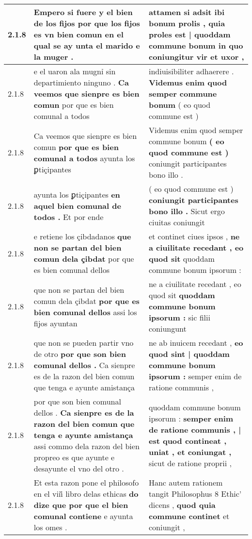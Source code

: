 \begin{tabular}{|p{1cm}|p{6.5cm}|p{6.5cm}|}
2.1.8 & Empero si fuere y el bien de los fijos \textbf{ por que los fijos es vn bien comun } en el qual se ay unta el marido e la muger . & attamen si adsit ibi bonum prolis , \textbf{ quia proles est | quoddam commune bonum } in quo coniungitur vir et uxor , \\\hline
2.1.8 & e el uaron ala mugnỉ sin departimiento ninguno . \textbf{ Ca veemos que sienpre es bien comun } por que es bien comunal a todos & indiuisibiliter adhaerere . \textbf{ Videmus enim quod semper commune bonum } ( eo quod commune est ) \\\hline
2.1.8 & Ca veemos que sienpre es bien comun \textbf{ por que es bien comunal a todos } ayunta los ꝑtiçipantes & Videmus enim quod semper commune bonum \textbf{ ( eo quod commune est ) } coniungit participantes bono illo . \\\hline
2.1.8 & ayunta los ꝑtiçipantes \textbf{ en aquel bien comunal de todos . } Et por ende & ( eo quod commune est ) \textbf{ coniungit participantes bono illo . } Sicut ergo ciuitas coniungit \\\hline
2.1.8 & e retiene los çibdadanos \textbf{ que non se partan del bien comun dela çibdat } por que es bien comunal dellos & et continet ciues ipsos , \textbf{ ne a ciuilitate recedant , eo quod sit } quoddam commune bonum ipsorum : \\\hline
2.1.8 & que non se partan del bien comun dela çibdat \textbf{ por que es bien comunal dellos } assi los fijos ayuntan & ne a ciuilitate recedant , eo quod sit \textbf{ quoddam commune bonum ipsorum : } sic filii coniungunt \\\hline
2.1.8 & que non se pueden partir vno de otro \textbf{ por que son bien comunal dellos . } Ca sienpre es de la razon del bien comun que tenga e ayunte amistança & ne ab inuicem recedant , \textbf{ eo quod sint | quoddam commune bonum ipsorum : } semper enim de ratione communis , \\\hline
2.1.8 & por que son bien comunal dellos . \textbf{ Ca sienpre es de la razon del bien comun que tenga e ayunte amistança } assi commo dela razon del bien propreo es que ayunte e desayunte el vno del otro . & quoddam commune bonum ipsorum : \textbf{ semper enim de ratione communis , | est quod contineat , uniat , et coniungat , } sicut de ratione proprii , \\\hline
2.1.8 & Et esta razon pone el philosofo en el viii̊ libro delas ethicas \textbf{ do dize que por que el bien comunal contiene } e ayunta los omes . & Hanc autem rationem tangit Philosophus 8 Ethic’ dicens , \textbf{ quod quia commune continet } et coniungit , \\\hline

\end{tabular}
